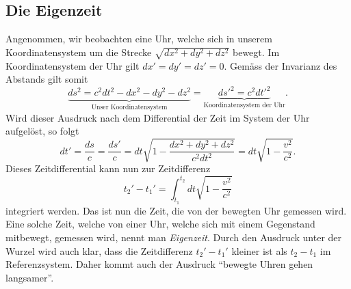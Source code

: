 \subsection{Die Eigenzeit 
\label{relativ:section:eigenzeit}}

Angenommen, wir beobachten eine Uhr,
welche sich in unserem Koordinatensystem um die Strecke
\(\sqrt{dx^2 + dy^2 + dz^2}\)
bewegt.
Im Koordinatensystem der Uhr gilt
\(dx' = dy' = dz' = 0\).
Gemäss der Invarianz des Abstands gilt somit
\begin{equation*}
    \underbrace{ds^2 = c^2 dt^2 - dx^2 - dy^2 - dz^2}_{\text{Unser Koordinatensystem}}
        = \underbrace{ds'^2 = c^2 dt'^2}_{\text{Koordinatensystem der Uhr}} .
\end{equation*}
Wird dieser Ausdruck nach dem Differential der Zeit im System der Uhr aufgelöst,
so folgt
\begin{equation}
    dt' = \frac{ds}{c} = \frac{ds'}{c}
    = dt \sqrt{1 - \frac{dx^2+dy^2+dz^2}{c^2 dt^2}}
    = dt \sqrt{1 - \frac{v^2}{c^2}}.
    \label{relativ:eqn:differential-eigenzeit}
\end{equation}
Dieses Zeitdifferential kann nun zur Zeitdifferenz
\begin{equation}
    t_2' - t_1' = \int_{t_1}^{t_2} dt \sqrt{1 - \frac{v^2}{c^2}}
    \label{relativ:eqn:eigenzeit}
\end{equation}
integriert werden.
Das ist nun die Zeit, die von der bewegten Uhr gemessen wird.
Eine solche Zeit, welche von einer Uhr,
welche sich mit einem Gegenstand mitbewegt, gemessen wird,
nennt man \emph{Eigenzeit}.
Durch den Ausdruck unter der Wurzel wird auch klar,
dass die Zeitdifferenz \(t_2'- t_1'\) kleiner ist
als \(t_2 - t_1\) im Referenzsystem.
Daher kommt auch der Ausdruck
``bewegte Uhren gehen langsamer''.
